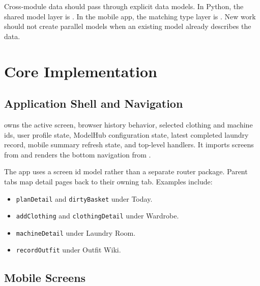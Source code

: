 \documentclass[11pt,a4paper]{article}
\begin{document}
Cross-module data should pass through explicit data models. In Python, the shared model layer is . In the mobile app, the matching type layer is . New work should not create parallel models when an existing model already describes the data.

\section{Core Implementation}

\subsection{Application Shell and Navigation}

 owns the active screen, browser history behavior, selected clothing and machine ids, user profile state, ModelHub configuration state, latest completed laundry record, mobile summary refresh state, and top-level handlers. It imports screens from  and renders the bottom navigation from .

The app uses a screen id model rather than a separate router package. Parent tabs map detail pages back to their owning tab. Examples include:

\begin{itemize}
  \item \texttt{planDetail} and \texttt{dirtyBasket} under Today.
  \item \texttt{addClothing} and \texttt{clothingDetail} under Wardrobe.
  \item \texttt{machineDetail} under Laundry Room.
  \item \texttt{recordOutfit} under Outfit Wiki.
\end{itemize}

\subsection{Mobile Screens}
\end{document}
